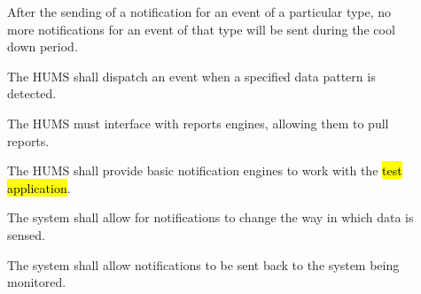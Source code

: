 \begin{description}
	\item[]After the sending of a notification for an event of a particular 
		type, no more notifications for an event of that type will be 	
		sent during the cool down period.
	\item[]The HUMS shall dispatch an event when a specified data 
		pattern is detected.
	\item[] The HUMS must interface with reports engines, allowing 
		them to pull reports.
	\item[] The HUMS shall provide basic notification 			
		engines to work with the \hl{test application}. %
	\item[] The system shall allow for notifications to change the way 
		in which data is sensed.
	 \item[] The system shall allow notifications to be sent back to 
		the system being monitored.
\end{description}

